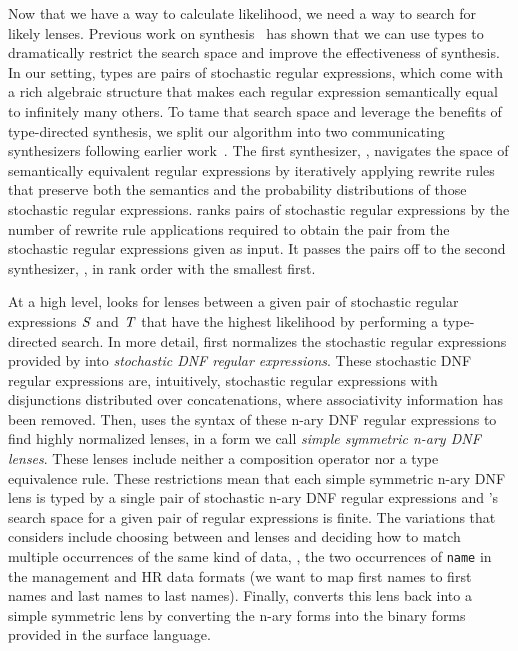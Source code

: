 \documentclass[acmsmall,screen,anonymous]{acmart}
\begin{document}
Now that we have a way to calculate likelihood, we need a way to search for
likely lenses. Previous work on synthesis~\cite{?,?,?} has shown that we can use
types to dramatically restrict the search space and improve the effectiveness of
synthesis. In our setting, types are pairs of stochastic regular expressions,
which come with a rich algebraic structure that makes each regular expression
semantically equal to infinitely many others. To tame that search space and
leverage the benefits of type-directed synthesis, we split our algorithm into
two communicating synthesizers following earlier
work~\cite{quotient-lens-synthesis}. The first synthesizer, \RXSearch, navigates
the space of semantically equivalent regular expressions by iteratively applying
rewrite rules that preserve both the semantics and the probability distributions
of those stochastic regular expressions. \RXSearch ranks pairs of stochastic
regular expressions by the number of rewrite rule applications required to
obtain the pair from the stochastic regular expressions given as input. It
passes the pairs off to the second synthesizer, \GreedySynth, in rank order with
the smallest first.

At a high level, \GreedySynth looks for lenses between a given pair of
stochastic regular expressions $\mathit{S}$ and $\mathit{T}$ that have the highest
likelihood by performing a type-directed search. In more detail, \GreedySynth
first normalizes the stochastic regular expressions provided by \RXSearch into
\emph{stochastic DNF regular expressions}. These stochastic DNF regular
expressions are, intuitively, stochastic regular expressions with disjunctions
distributed over concatenations, where associativity information has been
removed. Then, \GreedySynth uses the syntax of these n-ary DNF regular
expressions to find highly normalized lenses, in a form we call \emph{simple
  symmetric n-ary DNF lenses}. These lenses include neither a composition
operator nor a type equivalence rule. These restrictions mean that each simple
symmetric n-ary DNF lens is typed by a single pair of stochastic n-ary DNF
regular expressions and \GreedySynth's search space for a given pair of regular
expressions is finite. The variations that \GreedySynth considers include
choosing between \IdentityLens{} and \Disconnect lenses and deciding how to
match multiple occurrences of the same kind of data, \EG, the two occurrences of
\lstinline{name} in the management and HR data formats (we want to map first
names to first names and last names to last names). Finally, \GreedySynth
converts this lens back into a simple symmetric lens by converting the n-ary
forms into the binary forms provided in the surface language.
\end{document}

